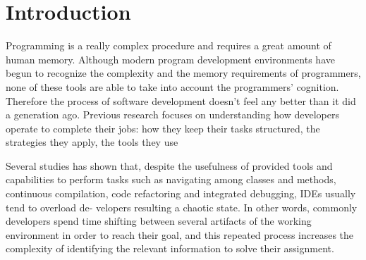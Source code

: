 \chapter{Introduction}

Programming is a really complex procedure and requires a great amount of human memory. Although modern program development environments have begun to recognize the complexity and the memory requirements of programmers, none of these tools are able to take into account the programmers' cognition.  Therefore the process of software development doesn't feel any better than it did a generation ago. Previous research focuses on understanding how developers operate to complete their jobs: how they keep their tasks structured, the strategies they apply, the tools they use


Several studies has shown that, despite the usefulness of provided tools and capabilities to perform tasks such as navigating among classes and methods, continuous compilation, code refactoring and integrated debugging, IDEs usually tend to overload de- velopers resulting a chaotic state. In other words, commonly developers spend time shifting between several artifacts of the working environment in order to reach their goal, and this repeated process increases the complexity of identifying the relevant information to solve their assignment. 







